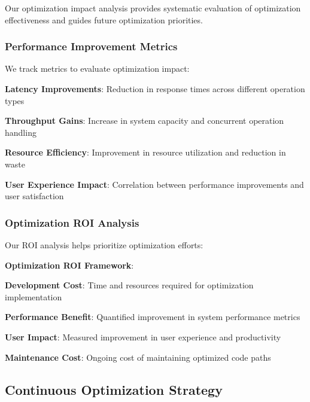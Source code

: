 Our optimization impact analysis provides systematic evaluation of optimization effectiveness and guides future optimization priorities.

\subsubsection*{Performance Improvement Metrics}

We track metrics to evaluate optimization impact:

\begin{expandedlist}
    \item \textbf{Latency Improvements}: Reduction in response times across different operation types
    \item \textbf{Throughput Gains}: Increase in system capacity and concurrent operation handling
    \item \textbf{Resource Efficiency}: Improvement in resource utilization and reduction in waste
    \item \textbf{User Experience Impact}: Correlation between performance improvements and user satisfaction
\end{expandedlist}

\subsubsection*{Optimization ROI Analysis}

Our ROI analysis helps prioritize optimization efforts:

\begin{alertbox}
\textbf{Optimization ROI Framework}:
\begin{compactlist}
    \item \textbf{Development Cost}: Time and resources required for optimization implementation
    \item \textbf{Performance Benefit}: Quantified improvement in system performance metrics
    \item \textbf{User Impact}: Measured improvement in user experience and productivity
    \item \textbf{Maintenance Cost}: Ongoing cost of maintaining optimized code paths
\end{compactlist}
\end{alertbox}

\subsection*{Continuous Optimization Strategy}

